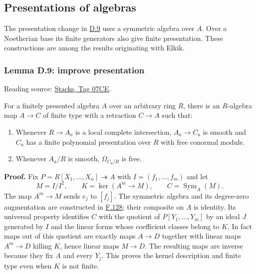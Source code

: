 \documentclass[11pt,a4paper,openany]{report}
\providecommand{\tightlist}{\setlength{\itemsep}{0pt}\setlength{\parskip}{0pt}}
\begin{document}
\subsection{Presentations of algebras}\label{AG-RG-S05-presentations-of-algebras}

\label{AG-RG-S05-smoothing-section-presentations}

The presentation change in \hyperref[AG-RG-S05-smoothing-lemma-improve-presentation]{D.9} uses a symmetric algebra over \(A\). Over a Noetherian base its finite generators also give finite presentation. These constructions are among the results originating with Elkik.

\label{AG-RG-S05-smoothing-lemma-improve-presentation}

\subsubsection{Lemma D.9: improve presentation}\label{AG-RG-S05-lemma-d.9-improve-presentation}

Reading source: \href{https://stacks.math.columbia.edu/tag/07CE}{Stacks, Tag 07CE}.

For a finitely presented algebra \(A\) over an arbitrary ring \(R\), there is an \(R\)-algebra map \(A\to C\) of finite type with a retraction \(C\to A\) such that:

\begin{enumerate}
\def\labelenumi{\arabic{enumi}.}
\tightlist
\item
  Whenever \(R\to A_a\) is a local complete intersection, \(A_a\to C_a\) is smooth and \(C_a\) has a finite polynomial presentation over \(R\) with free conormal module.
\item
  Whenever \(A_a/R\) is smooth, \(\Omega_{C_a/R}\) is free.
\end{enumerate}

\textbf{Proof.} Fix \(P=R[X_1,\ldots,X_n]\twoheadrightarrow A\) with \(I=(f_1,\ldots,f_m)\) and let \[M=I/I^2,\qquad K=\ker(A^m\longrightarrow M),\qquad C=\operatorname{Sym}_A(M).\] The map \(A^m\to M\) sends \(e_j\) to \([f_j]\). The symmetric algebra and its degree-zero augmentation are constructed in \hyperref[AG-RG-S05-more-algebra-lemma-symmetric-algebra-smooth]{F.128}; their composite on \(A\) is identity. Its universal property identifies \(C\) with the quotient of \(P[Y_1,\ldots,Y_m]\) by an ideal \(J\) generated by \(I\) and the linear forms whose coefficient classes belong to \(K\). In fact maps out of this quotient are exactly maps \(A\to D\) together with linear maps \(A^m\to D\) killing \(K\), hence linear maps \(M\to D\). The resulting maps are inverse because they fix \(A\) and every \(Y_j\). This proves the kernel description and finite type even when \(K\) is not finite.
\end{document}
